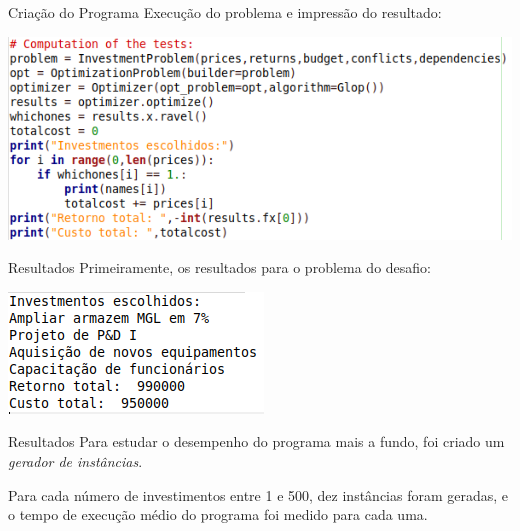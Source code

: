 \documentclass{beamer}
\begin{document}
\begin{frame}{Criação do Programa}
Execução do problema e impressão do resultado:
\begin{center}
\includegraphics[scale=0.4]{CONCLUSION_FOR_PRESENTATION.png}
\end{center}
\end{frame}

\begin{frame}{Resultados}
Primeiramente, os resultados para o problema do desafio:\pause
\begin{center}
\includegraphics[scale=0.8]{RESULT_FOR_PRESENTATION.png}
\end{center}
\end{frame}

\begin{frame}{Resultados}
Para estudar o desempenho do programa mais a fundo, foi criado um
\emph{gerador de instâncias}.\pause

Para cada número de investimentos entre 1 e 500, dez instâncias foram geradas,
e o tempo de execução médio do programa foi medido para cada uma.
\end{frame}
\end{document}
